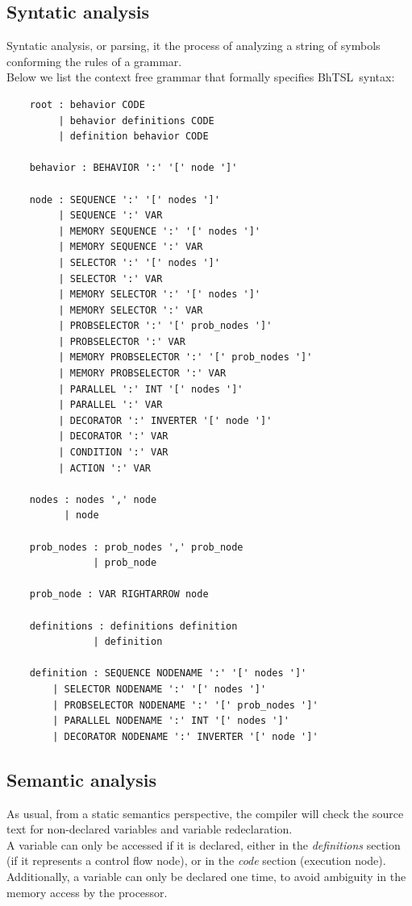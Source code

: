 \documentclass[a4paper,UKenglish,cleveref, autoref, thm-restate]{oasics-v2019}
\def\bht{BhTSL}
\begin{document}
\subsection{Syntatic analysis}
Syntatic analysis, or parsing, it the process of analyzing a string of symbols conforming the rules of a grammar. \\
Below  we list the context free grammar that formally specifies \bht\ syntax:
\begin{lstlisting}
    root : behavior CODE
         | behavior definitions CODE
         | definition behavior CODE

    behavior : BEHAVIOR ':' '[' node ']'

    node : SEQUENCE ':' '[' nodes ']'
         | SEQUENCE ':' VAR
         | MEMORY SEQUENCE ':' '[' nodes ']'
         | MEMORY SEQUENCE ':' VAR
         | SELECTOR ':' '[' nodes ']'
         | SELECTOR ':' VAR
         | MEMORY SELECTOR ':' '[' nodes ']'
         | MEMORY SELECTOR ':' VAR
         | PROBSELECTOR ':' '[' prob_nodes ']'
         | PROBSELECTOR ':' VAR
         | MEMORY PROBSELECTOR ':' '[' prob_nodes ']'
         | MEMORY PROBSELECTOR ':' VAR
         | PARALLEL ':' INT '[' nodes ']'
         | PARALLEL ':' VAR
         | DECORATOR ':' INVERTER '[' node ']'
         | DECORATOR ':' VAR
         | CONDITION ':' VAR
         | ACTION ':' VAR

    nodes : nodes ',' node
          | node

    prob_nodes : prob_nodes ',' prob_node
               | prob_node

    prob_node : VAR RIGHTARROW node

    definitions : definitions definition
               | definition

    definition : SEQUENCE NODENAME ':' '[' nodes ']'
        | SELECTOR NODENAME ':' '[' nodes ']'
        | PROBSELECTOR NODENAME ':' '[' prob_nodes ']'
        | PARALLEL NODENAME ':' INT '[' nodes ']'
        | DECORATOR NODENAME ':' INVERTER '[' node ']'
\end{lstlisting}

\subsection{Semantic analysis}
As usual, from a static semantics perspective, the compiler will check the source text 
for non-declared variables and variable redeclaration.\\
A variable can only be accessed if it is declared, either in the \textit{definitions} section 
(if it represents a control flow node), or in the \textit{code} section (execution node).
Additionally, a variable can only be declared one time, to avoid ambiguity in the memory access by the processor.
\end{document}
